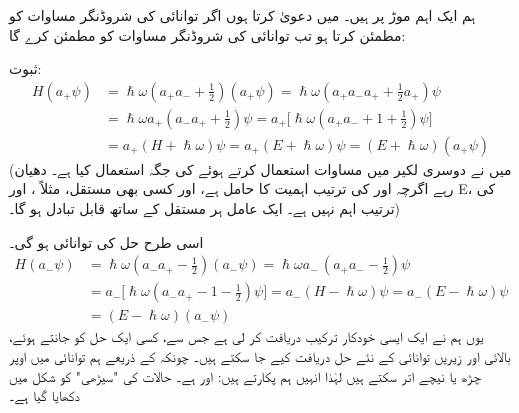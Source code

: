  ہم ایک اہم موڑ پر ہیں۔ میں دعویٰ کرتا ہوں  اگر    توانائی  کی شروڈنگر  مساوات کو  مطمئن کرتا ہو 
  تب  توانائی  کی شروڈنگر  مساوات کو   مطمئن کرے گا:  

ثبوت:
\begin{align*}
H ( a_+ \psi ) &= \hslash \omega ( a_+ a_- + \frac{1}{2}) (a_+ \psi) = \hslash \omega (a_+ a_- a_+ +  \frac{1}{2}  a_+) \psi
\\
  &= \hslash \omega a_+ ( a_- a_+ + \tfrac{1}{2} ) \psi  = a_+\big[ \hslash \omega ( a_+ a_- + 1 + \tfrac{1}{2} ) \psi \big ]\\
  &= a_+ ( H + \hslash \omega ) \psi = a_+ ( E + \hslash \omega ) \psi = ( E + \hslash \omega ) ( a_+ \psi )
\end{align*}  
(میں نے دوسری لکیر میں مساوات  استعمال کرتے ہوئے  
 کی جگہ    استعمال کیا ہے۔ دھیان  رہے اگرچہ   اور   کی ترتیب اہمیت کا حامل ہے،  
   اور کسی بھی مستقل، مثلاً ،  اور E،   کی ترتیب اہم نہیں ہے۔ ایک عامل ہر مستقل کے ساتھ قابل تبادل ہو گا۔)

 اسی طرح حل   کی  توانائی  ہو گی۔
\begin{align*}
H(a_- \psi ) &= \hslash \omega ( a_- a_+   - \tfrac{1}{2}) (a_- \psi)    = \hslash \omega a_- \,( a_+ a_-  - \tfrac{1}{2} ) \psi\\
&= a_- \big[ \hslash \omega ( a_- a_+  - 1 - \tfrac{1}{2} ) \psi \big] = a_- ( H - \hslash \omega )\psi = a_- ( E - \hslash \omega) \psi \\	
&=( E - \hslash \omega ) ( a_- \psi )
\end{align*}
یوں ہم نے ایک ایسی خودکار ترکیب دریافت کر لی ہے  جس سے، کسی ایک حل کو جانتے ہوئے،  بالائی اور زیریں توانائی کے نئے حل دریافت کیے جا سکتے ہیں۔ چونکہ  کے ذریعے ہم توانائی میں اوپر چڑھ  یا نیچے اتر سکتے ہیں لہٰذا انہیں ہم  پکارتے ہیں:   اور    ہے۔ حالات کی "سیڑھی" کو شکل  میں دکھایا گیا ہے۔

